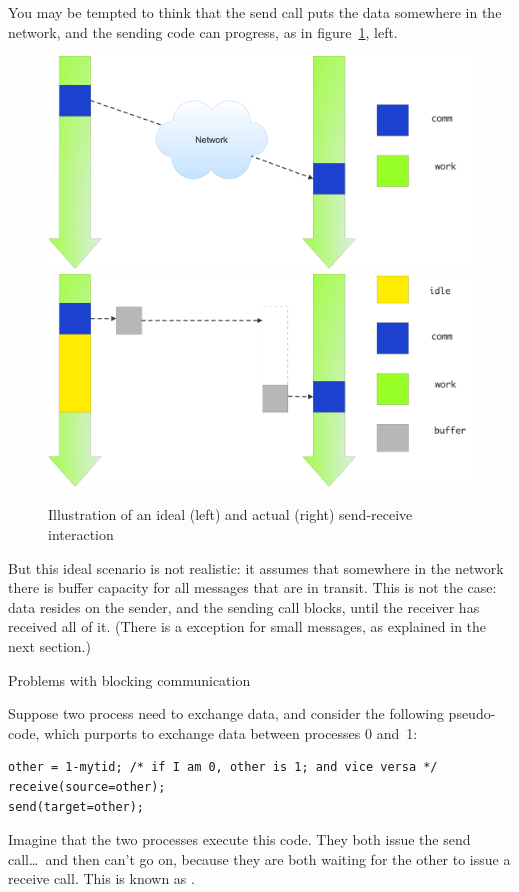 You may be tempted to think that the send call puts the data somewhere
in the network, and the sending code can progress,
as in figure~\ref{fig:send-ideal}, left.
%
\begin{figure}[ht]
\leavevmode
\includegraphics[scale=.08]{graphics/send-ideal}
\includegraphics[scale=.08]{graphics/send-blocking}
\caption{Illustration of an ideal (left) and actual (right) send-receive interaction}
\label{fig:send-ideal}
\end{figure}
%
But this ideal scenario is not realistic: it assumes that somewhere
in the network there is buffer capacity for all messages that are in
transit.
This is not the case: data resides on the sender, and the sending call blocks,
until the receiver has received all of it. (There is a exception for
small messages, as explained in the next section.)

 {Problems with blocking communication}

Suppose two process need to exchange data, and consider the following
pseudo-code, which purports to exchange data between processes 0 and~1:
\begin{verbatim}
other = 1-mytid; /* if I am 0, other is 1; and vice versa */
receive(source=other);
send(target=other);
\end{verbatim}
Imagine that the two processes execute this code. They both issue the
send call\ldots\ and then can't go on, because they are both waiting
for the other to issue a receive call. This is known
as .


